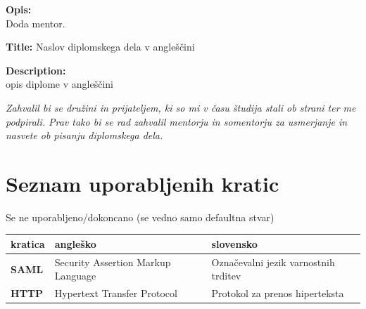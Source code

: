 \documentclass[a4paper,12pt,openright]{book}
\newcommand{\clearemptydoublepage}{\newpage{\pagestyle{empty}\cleardoublepage}}
\begin{document}
\bigskip
\noindent\textbf{Opis:}\\
Doda mentor.

\bigskip
\noindent\textbf{Title:} Naslov diplomskega dela v angleščini

\bigskip
\noindent\textbf{Description:}\\
opis diplome v angleščini

\vfill



\vspace{2cm}

\clearemptydoublepage

\thispagestyle{empty}\mbox{}\vfill\null\it%
\noindent
Zahvalil bi se družini in prijateljem, ki so mi v času študija stali ob strani ter me podpirali.
Prav tako bi se rad zahvalil mentorju in somentorju za usmerjanje in nasvete ob pisanju diplomskega dela. 
\rm\normalfont

\clearemptydoublepage

\pagestyle{empty}
\def\thepage{}%
\tableofcontents{}


\clearemptydoublepage


\chapter*{Seznam uporabljenih kratic}
Se ne uporabljeno/dokoncano (se vedno samo defaultna stvar) \newline
\noindent\begin{tabular}{p{}|p{}|p{}}    %
  {\bf kratica} & {\bf angleško}                              & {\bf slovensko} \\ \hline
  {\bf SAML}      & Security Assertion Markup Language               & Označevalni jezik varnostnih trditev \\
  {\bf HTTP} & Hypertext Transfer Protocol & Protokol za prenos hiperteksta \\
\end{tabular}


\clearemptydoublepage

\end{document}
